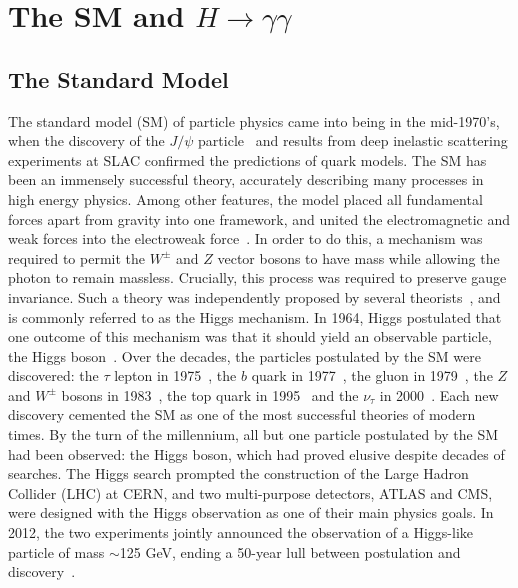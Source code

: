 \documentclass[10pt]{article}
\begin{document}
\newpage

\section{The SM and $H \rightarrow \gamma \gamma$}

\subsection{The Standard Model}


The standard model (SM) of particle physics came into being in the mid-1970's, when the discovery of the $J / \psi$ particle~\cite{RichterPsi,TingJ} and results from deep inelastic scattering experiments at SLAC confirmed the predictions of quark models. The SM has been an immensely successful theory, accurately describing many processes in high energy physics. Among other features, the model placed all fundamental forces apart from gravity into one framework, and united the electromagnetic and weak forces into the electroweak force~\cite{GIM,Salam,Weinberg}. In order to do this, a mechanism was required to permit the $W^{\pm}$ and $Z$ vector bosons to have mass while allowing the photon to remain massless. Crucially, this process was required to preserve gauge invariance. Such a theory was independently proposed by several theorists~\cite{BroutEnglert,Higgs1,Higgs2,Kibble1,Higgs3,Kibble2}, and is commonly referred to as the Higgs mechanism. In 1964, Higgs postulated that one outcome of this mechanism was that it should yield an observable particle, the Higgs boson~\cite{Higgs2}. Over the decades, the particles postulated by the SM were discovered: the $\tau$ lepton in 1975~\cite{tauDisc}, the $b$ quark in 1977~\cite{bquarkDisc}, the gluon in 1979~\cite{Gluon1,Gluon2,Gluon3}, the $Z$ and $W^{\pm}$ bosons in 1983~\cite{ZDisc,WDisc}, the top quark in 1995~\cite{tquarkDisc1,tquarkDisc2} and the $\nu_{\tau}$ in 2000~\cite{TauNuDisc}. Each new discovery cemented the SM as one of the most successful theories of modern times. By the turn of the millennium, all but one particle postulated by the SM had been observed: the Higgs boson, which had proved elusive despite decades of searches. The Higgs search prompted the construction of the Large Hadron Collider (LHC) at CERN, and two multi-purpose detectors, ATLAS and CMS, were designed with the Higgs observation as one of their main physics goals. In 2012, the two experiments jointly announced the observation of a Higgs-like particle of mass $\sim$125 GeV, ending a 50-year lull between postulation and discovery~\cite{CMSHDisc,ATLASHDisc}.
\end{document}
